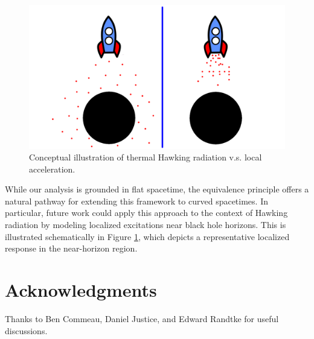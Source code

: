 \documentclass[12pt,a4paper]{article}
\begin{document}
\begin{figure}[h]
\centering
\includegraphics[scale=0.5]{rocket.png}
\caption{Conceptual illustration of thermal Hawking radiation v.s. local acceleration.}
\label{rocket}
\end{figure}

While our analysis is grounded in flat spacetime, the equivalence principle offers a natural pathway for extending this framework to curved spacetimes. In particular, future work could apply this approach to the context of Hawking radiation by modeling localized excitations near black hole horizons. This is illustrated schematically in Figure \ref{rocket}, which depicts a representative localized response in the near-horizon region.

\section{Acknowledgments}
Thanks to Ben Commeau, Daniel Justice, and Edward Randtke for useful discussions.



\end{document}
